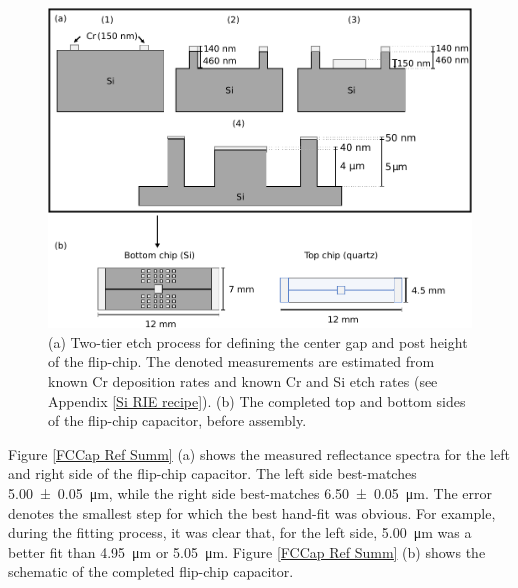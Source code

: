 \documentclass[double,12pt,1in,seploa]{beavtex}
\begin{document}
\begin{figure}
    \includegraphics[width=1\textwidth]{Two-tier etch.pdf}
    \caption{(a) Two-tier etch process for defining the center gap and post height of the flip-chip. The denoted measurements are estimated from known Cr deposition rates and known Cr and Si etch rates (see Appendix \ref{Si RIE recipe}). (b) The completed top and bottom sides of the flip-chip capacitor, before assembly.}
    \label{twotier}
\end{figure}

Figure \ref{FCCap Ref Summ} (a) shows the measured reflectance spectra for the left and right side of the flip-chip capacitor. The left side best-matches \SI{5.00(5)}{\micro\meter}, while the right side best-matches \SI{6.50(5)}{\micro\meter}. The error denotes the smallest step for which the best hand-fit was obvious. For example, during the fitting process, it was clear that, for the left side, \SI{5.00}{\micro\meter} was a better fit than \SI{4.95}{\micro\meter} or \SI{5.05}{\micro\meter}. Figure \ref{FCCap Ref Summ} (b) shows the schematic of the completed flip-chip capacitor.
\end{document}

